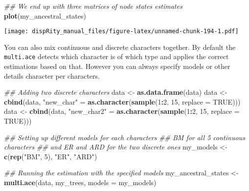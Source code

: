 \documentclass[
]{book}
\newenvironment{Shaded}{\begin{snugshade}}{\end{snugshade}}
\newcommand{\CommentTok}[1]{\textcolor[rgb]{0.56,0.35,0.01}{\textit{#1}}}
\newcommand{\DataTypeTok}[1]{\textcolor[rgb]{0.13,0.29,0.53}{#1}}
\newcommand{\DecValTok}[1]{\textcolor[rgb]{0.00,0.00,0.81}{#1}}
\newcommand{\KeywordTok}[1]{\textcolor[rgb]{0.13,0.29,0.53}{\textbf{#1}}}
\newcommand{\NormalTok}[1]{#1}
\newcommand{\OperatorTok}[1]{\textcolor[rgb]{0.81,0.36,0.00}{\textbf{#1}}}
\newcommand{\OtherTok}[1]{\textcolor[rgb]{0.56,0.35,0.01}{#1}}
\newcommand{\StringTok}[1]{\textcolor[rgb]{0.31,0.60,0.02}{#1}}
\begin{document}
\begin{Shaded}
\begin{Highlighting}[]
\CommentTok{\#\# We end up with three matrices of node states estimates}
\KeywordTok{plot}\NormalTok{(my\_ancestral\_states)}
\end{Highlighting}
\end{Shaded}

\texttt{[image: dispRity\_manual\_files/figure-latex/unnamed-chunk-194-1.pdf]}

You can also mix continuous and discrete characters together.
By default the \texttt{multi.ace} detects which character is of which type and applies the correct estimations based on that.
However you can always specify models or other details character per characters.

\begin{Shaded}
\begin{Highlighting}[]
\CommentTok{\#\# Adding two discrete characters}
\NormalTok{data \textless{}{-}}\StringTok{ }\KeywordTok{as.data.frame}\NormalTok{(data)}
\NormalTok{data \textless{}{-}}\StringTok{ }\KeywordTok{cbind}\NormalTok{(data, }\StringTok{"new\_char"}\NormalTok{ =}\StringTok{ }\KeywordTok{as.character}\NormalTok{(}\KeywordTok{sample}\NormalTok{(}\DecValTok{1}\OperatorTok{:}\DecValTok{2}\NormalTok{, }\DecValTok{15}\NormalTok{, }\DataTypeTok{replace =} \OtherTok{TRUE}\NormalTok{)))}
\NormalTok{data \textless{}{-}}\StringTok{ }\KeywordTok{cbind}\NormalTok{(data, }\StringTok{"new\_char2"}\NormalTok{ =}\StringTok{ }\KeywordTok{as.character}\NormalTok{(}\KeywordTok{sample}\NormalTok{(}\DecValTok{1}\OperatorTok{:}\DecValTok{2}\NormalTok{, }\DecValTok{15}\NormalTok{, }\DataTypeTok{replace =} \OtherTok{TRUE}\NormalTok{)))}

\CommentTok{\#\# Setting up different models for each characters}
\CommentTok{\#\# BM for all 5 continuous characters}
\CommentTok{\#\# and ER and ARD for the two discrete ones}
\NormalTok{my\_models \textless{}{-}}\StringTok{ }\KeywordTok{c}\NormalTok{(}\KeywordTok{rep}\NormalTok{(}\StringTok{"BM"}\NormalTok{, }\DecValTok{5}\NormalTok{), }\StringTok{"ER"}\NormalTok{, }\StringTok{"ARD"}\NormalTok{)}

\CommentTok{\#\# Running the estimation with the specified models}
\NormalTok{my\_ancestral\_states \textless{}{-}}\StringTok{ }\KeywordTok{multi.ace}\NormalTok{(data, my\_trees, }\DataTypeTok{models =}\NormalTok{ my\_models)}
\end{Highlighting}
\end{Shaded}
\end{document}
